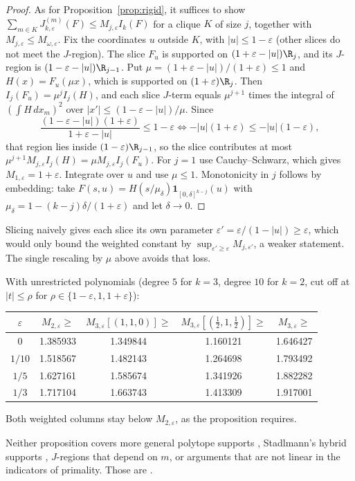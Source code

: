 \begin{proof}
As for Proposition~\ref{prop:rigid}, it suffices to show
$\sum_{m\in K}J_{k,\varepsilon}^{(m)}(F)\le M_{j,\varepsilon}I_k(F)$ for a
clique $K$ of size $j$, together with $M_{j,\varepsilon}\le M_{\omega,\varepsilon}$.
Fix the coordinates $u$ outside $K$, with $|u|\le1-\varepsilon$ (other slices
do not meet the $J$-region). The slice $F_u$ is supported on
$(1+\varepsilon-|u|)\R_j$, and its $J$-region is
$(1-\varepsilon-|u|)\R_{j-1}$. Put $\mu=(1+\varepsilon-|u|)/(1+\varepsilon)\le1$
and $H(x)=F_u(\mu x)$, which is supported on $(1+\varepsilon)\R_j$. Then
$I_j(F_u)=\mu^jI_j(H)$, and each slice $J$-term equals $\mu^{j+1}$ times the
integral of $(\int H\,dx_m)^2$ over $|x'|\le(1-\varepsilon-|u|)/\mu$. Since
\[
\frac{(1-\varepsilon-|u|)(1+\varepsilon)}{1+\varepsilon-|u|}\le1-\varepsilon
\iff -|u|(1+\varepsilon)\le-|u|(1-\varepsilon),
\]
that region lies inside $(1-\varepsilon)\R_{j-1}$, so the slice contributes at
most $\mu^{j+1}M_{j,\varepsilon}I_j(H)=\mu M_{j,\varepsilon}I_j(F_u)$. For
$j=1$ use Cauchy--Schwarz, which gives $M_{1,\varepsilon}=1+\varepsilon$.
Integrate over $u$ and use $\mu\le1$. Monotonicity in $j$ follows by
embedding: take $F(s,u)=H(s/\mu_\delta)\mathbf 1_{[0,\delta]^{k-j}}(u)$ with
$\mu_\delta=1-(k-j)\delta/(1+\varepsilon)$ and let $\delta\to0$.
\end{proof}

Slicing naively gives each slice its own parameter
$\varepsilon'=\varepsilon/(1-|u|)\ge\varepsilon$, which would only bound the
weighted constant by $\sup_{\varepsilon'\ge\varepsilon}M_{j,\varepsilon'}$, a
weaker statement. The single rescaling by $\mu$ above avoids that loss.

\begin{remark}[\lbl{Computed}, $k=3$]
With unrestricted polynomials (degree $5$ for $k=3$, degree $10$ for $k=2$,
cut off at $|t|\le\rho$ for $\rho\in\{1-\varepsilon,1,1+\varepsilon\}$):
\begin{center}
\begin{tabular}{@{}ccccc@{}}
\toprule
$\varepsilon$ & $M_{2,\varepsilon}\ge$ & $M_{3,\varepsilon}[(1,1,0)]\ge$ & $M_{3,\varepsilon}[(\frac12,1,\frac12)]\ge$ & $M_{3,\varepsilon}\ge$\\
\midrule
$0$ & 1.385933 & 1.349844 & 1.160121 & 1.646427\\
$1/10$ & 1.518567 & 1.482143 & 1.264698 & 1.793492\\
$1/5$ & 1.627161 & 1.585674 & 1.341926 & 1.882282\\
$1/3$ & 1.717104 & 1.663743 & 1.413309 & 1.917001\\
\bottomrule
\end{tabular}
\end{center}
Both weighted columns stay below $M_{2,\varepsilon}$, as the proposition
requires.
\end{remark}

\begin{remark}[scope]
Neither proposition covers more general polytope supports
\cite[\S3]{Pol14b}, Stadlmann's hybrid supports \cite{Sta26}, $J$-regions
that depend on $m$, or arguments that are not linear in the indicators of
primality. Those are .
\end{remark}

